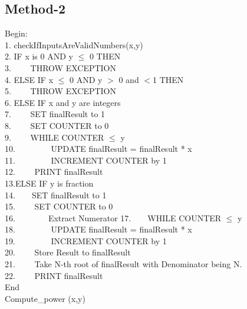 \documentclass[a4paper,12pt]{article}
\begin{document}
\subsection{Method-2}
        \begin{algorithm}[H]
        Begin: \\
        1. checkIfInputsAreValidNumbers(x,y)\\
        2. IF x is 0 AND y $\leq$ 0 THEN \\
        3. $\hspace{2em}$THROW EXCEPTION \\
        4. ELSE IF x $\leq$ 0 AND y $>$ 0 and $<$1 THEN \\
        5. $\hspace{2em}$THROW EXCEPTION \\
        6. ELSE IF x and y are integers\\
        7. $\hspace{2em}$SET finalResult to 1 \\
        8. $\hspace{2em}$SET COUNTER to 0\\
        9. $\hspace{2em}$WHILE COUNTER $\leq$ y \\
        10.$\hspace{4em}$ UPDATE finalResult = finalResult * x\\
        11.$\hspace{4em}$ INCREMENT COUNTER by 1\\
        12.$\hspace{2em}$ PRINT finalResult \\
        13.ELSE IF y is fraction\\
        14.$\hspace{2em}$SET finalResult to 1 \\
        15. $\hspace{2em}$SET COUNTER to 0\\
        16.$\hspace{4em}$Extract Numerator
        17.$\hspace{2em}$WHILE COUNTER $\leq$ y \\
        18.$\hspace{4em}$ UPDATE finalResult = finalResult * x\\
        19.$\hspace{4em}$ INCREMENT COUNTER by 1\\
        20.$\hspace{2em}$ Store Result to finalResult\\
        21.$\hspace{2em}$ Take N-th root of finalResult with Denominator being N.\\
        22.$\hspace{2em}$ PRINT finalResult \\
        End\\

        \caption{Compute\_power (x,y)}
        \end{algorithm}
       
\end{document}
